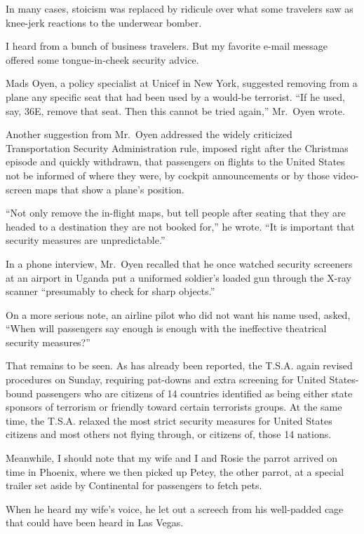 ﻿\documentclass[12pt]{article}
\begin{document}
In many cases, stoicism was replaced by ridicule over what some travelers saw as knee-jerk reactions
to the underwear bomber.

I heard from a bunch of business travelers. But my favorite e-mail message offered some
tongue-in-cheek security advice.

Mads Oyen, a policy specialist at Unicef in New York, suggested removing from a plane any specific
seat that had been used by a would-be terrorist. ``If he used, say, 36E, remove that seat. Then this
cannot be tried again,'' Mr.~Oyen wrote.

Another suggestion from Mr.~Oyen addressed the widely criticized Transportation Security
Administration rule, imposed right after the Christmas episode and quickly withdrawn, that
passengers on flights to the United States not be informed of where they were, by cockpit
announcements or by those video-screen maps that show a plane's position.

``Not only remove the in-flight maps, but tell people after seating that they are headed to a
destination they are not booked for,'' he wrote. ``It is important that security measures are
unpredictable.''

In a phone interview, Mr.~Oyen recalled that he once watched security screeners at an airport in
Uganda put a uniformed soldier's loaded gun through the X-ray scanner ``presumably to check for
sharp objects.''

On a more serious note, an airline pilot who did not want his name used, asked, ``When will
passengers say enough is enough with the ineffective theatrical security measures?''

That remains to be seen. As has already been reported, the T.S.A. again revised procedures on
Sunday, requiring pat-downs and extra screening for United States-bound passengers who are citizens
of 14 countries identified as being either state sponsors of terrorism or friendly toward certain
terrorists groups. At the same time, the T.S.A. relaxed the most strict security measures for United
States citizens and most others not flying through, or citizens of, those 14 nations.

Meanwhile, I should note that my wife and I and Rosie the parrot arrived on time in Phoenix, where
we then picked up Petey, the other parrot, at a special trailer set aside by Continental for
passengers to fetch pets.

When he heard my wife's voice, he let out a screech from his well-padded cage that could have been
heard in Las Vegas.
\end{document}
